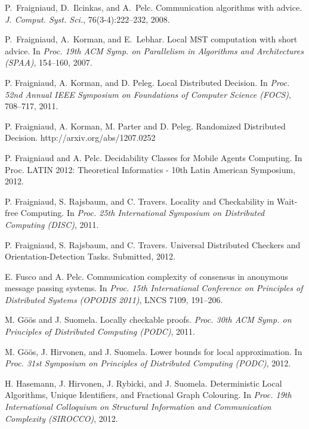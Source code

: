 \documentclass{llncs}
\begin{document}
\begin{thebibliography}{99}
P.~Fraigniaud, D.~Ilcinkas, and A.~Pelc.
\newblock Communication algorithms with advice.
\newblock \emph{J. Comput. Syst. Sci.}, 76(3-4):222--232, 2008.

P.~Fraigniaud, A.~Korman, and E.~Lebhar.
\newblock Local MST computation with short advice.
\newblock In \emph{Proc. 19th ACM Symp. on Parallelism in Algorithms
and Architectures (SPAA)}, 154--160, 2007.

P. Fraigniaud, A. Korman, and D. Peleg.
\newblock Local Distributed Decision.
\newblock In \emph{Proc. 52nd Annual IEEE Symposium
on Foundations of Computer Science (FOCS)}, 708--717, 2011.

P. Fraigniaud, A. Korman, M. Parter and D. Peleg.
\newblock Randomized Distributed Decision.
\newblock  http://arxiv.org/abs/1207.0252

P. Fraigniaud and A. Pelc.
\newblock Decidability Classes for Mobile Agents Computing.
\newblock In {Proc. LATIN 2012: Theoretical Informatics - 10th Latin American Symposium}, 2012.

P. Fraigniaud, S. Rajsbaum, and C. Travers.
\newblock Locality and  Checkability  in Wait-free Computing.
\newblock In \emph{Proc. 25th International Symposium on Distributed Computing (DISC)}, 2011.

P. Fraigniaud, S. Rajsbaum, and C. Travers.
\newblock Universal Distributed Checkers and Orientation-Detection Tasks.
\newblock Submitted, 2012.

E. Fusco and A. Pelc. 
\newblock Communication complexity of consensus in anonymous message passing systems. 
\newblock In \emph{Proc. 15th International Conference on Principles of Distributed Systems (OPODIS 2011)}, LNCS 7109, 191--206.

M. G\"o\"os and J. Suomela.
\newblock Locally checkable proofs.
\newblock \emph{Proc. 30th ACM Symp. on Principles of Distributed Computing (PODC)}, 2011.

M. G\"o\"os, J. Hirvonen, and J. Suomela.
\newblock Lower bounds for local approximation. 
\newblock In \emph{Proc. 31st Symposium on Principles of Distributed Computing (PODC)}, 2012.

H. Hasemann, J. Hirvonen, J. Rybicki, and J. Suomela. 
\newblock Deterministic Local Algorithms, Unique Identifiers, and Fractional Graph Colouring.
\newblock In \emph{Proc. 19th International Colloquium on Structural Information and Communication Complexity (SIROCCO)}, 2012.


\end{thebibliography}
\end{document}
